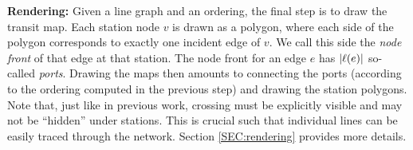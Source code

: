 \documentclass{llncs}
\begin{document}
%

\smallskip\noindent
{\bf Rendering:} 
Given a line graph and an ordering, the final step is to draw the transit map.
Each station node $v$ is drawn as a polygon, where each side of the polygon corresponds to exactly one incident edge of $v$.
We call this side the \emph{node front} of that edge at that station.
The node front for an edge $e$ has $|\ell(e)|$ so-called \emph{ports}.
Drawing the maps then amounts to connecting the ports (according to the ordering computed in the previous step) and drawing the station polygons.
Note that, just like in previous work, crossing must be explicitly visible and may not be ``hidden'' under stations.
This is crucial such that individual lines can be easily traced through the network.
Section \ref{SEC:rendering} provides more details.

\end{document}

